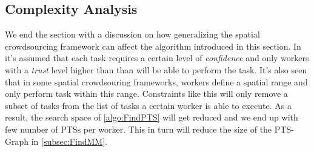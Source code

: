 \subsection{Complexity Analysis}

We end the section with a discussion on how generalizing the spatial crowdsourcing framework can affect the algorithm introduced in this section. In \cite{Kazemi13} it's assumed that each task requires a certain level of \emph{confidence} and only workers with a \emph{trust} level higher than than will be able to perform the task. It's also seen that in some spatial crowdsouring frameworks, workers define a spatial range and only perform task within this range. Constraints like this will only remove a subset of tasks from the list of tasks a certain worker is able to execute. As a result, the search space of \cref{algo:FindPTS} will get reduced and we end up with few number of PTSs per worker. This in turn will reduce the size of the PTS-Graph in \cref{subsec:FindMM}.